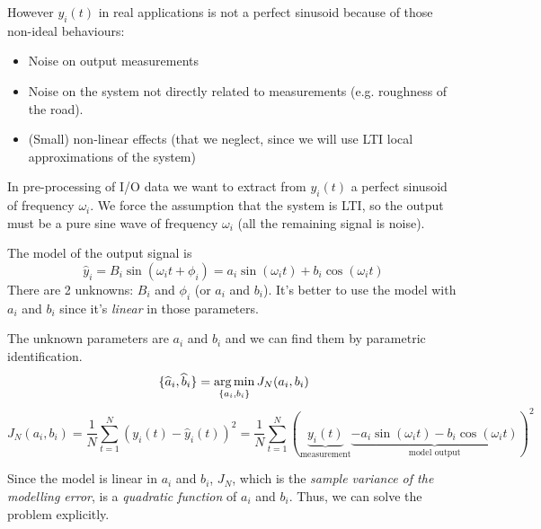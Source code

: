 However $y_i(t)$ in real applications is not a perfect sinusoid because of those non-ideal behaviours:
\begin{itemize}
    \item Noise on output measurements
    \item Noise on the system not directly related to measurements (e.g. roughness of the road).
    \item (Small) non-linear effects (that we neglect, since we will use LTI local approximations of the system)
\end{itemize}

In pre-processing of I/O data we want to extract from $y_i(t)$ a perfect sinusoid of frequency $\omega_i$.
We force the assumption that the system is LTI, so the output must be a pure sine wave of frequency $\omega_i$ (all the remaining signal is noise).

\begin{figure}[H]
    \centering
\end{figure}

The model of the output signal is
\[ \hat{y}_i = B_i \sin(\omega_it+\phi_i) = a_i\sin(\omega_it) + b_i\cos(\omega_it) \]
There are 2 unknowns: $B_i$ and $\phi_i$ (or $a_i$ and $b_i$).
It's better to use the model with $a_i$ and $b_i$ since it's \emph{linear} in those parameters.

The unknown parameters are $a_i$ and $b_i$ and we can find them by parametric identification.
\[ \{ \widehat{a}_i, \widehat{b}_i \} = \operatorname*{arg\,min}_{\{a_i, b_i\}} J_N(a_i, b_i) \]
\[ J_N(a_i, b_i) = \frac{1}{N} \sum_{t=1}^N \left ( y_i(t) - \hat{y}_i(t) \right ) ^ 2 = \frac{1}{N} \sum_{t=1}^N \left( \underbrace{y_i(t)}_{\text{measurement}} \underbrace{- a_i\sin(\omega_it) - b_i\cos(\omega_it)}_\text{model output}\right)^2 \]

Since the model is linear in $a_i$ and $b_i$, $J_N$, which is the \emph{sample variance of the modelling error}, is a \emph{quadratic function} of $a_i$ and $b_i$. Thus, we can solve the problem explicitly.

